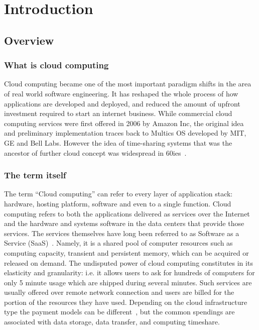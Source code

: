 \documentclass[licencjacka,en]{thesisclass}
\begin{document}
\chapter{Introduction}


    \section{Overview}

        \subsection{What is cloud computing}

        Cloud computing became one of the most important paradigm shifts in the area of real world software engineering.
        It has reshaped the whole process of how applications are developed and deployed, and reduced the amount of upfront
        investment required to start an internet business. While commercial cloud computing services were first offered
        in 2006 by Amazon Inc, the original idea and preliminary implementation traces back to Multics OS developed by MIT,
        GE and Bell Labs. However the idea of time-sharing systems that was the ancestor of further cloud
        concept was widespread in 60ies~\cite{Markus}.

        \subsection{The term itself}

        The term “Cloud computing” can refer to every layer of application stack:
        hardware, hosting platform, software and even to a single function.
        Cloud computing refers to both the applications delivered as services over the Internet and
        the hardware and systems software in the data centers that provide those services.
        The services themselves have long been referred to as Software as a Service (SaaS)~\cite{Armbrust}.
        Namely, it is a shared pool of computer resources such as computing capacity,
        transient and persistent memory, which can be acquired or released on demand.
        The undisputed power of cloud computing constitutes in its elasticity and granularity:
        i.e. it allows users to ask for hundreds of computers for only 5 minute usage which
        are shipped during several minutes.
        Such services are usually offered over remote network connection and users are billed
        for the portion of the resources they have used.
        Depending on the cloud infrastructure type the payment models can be different~\cite{Laatikainen},
        but the common spendings are associated with data storage, data transfer, and computing timeshare.
\end{document}
